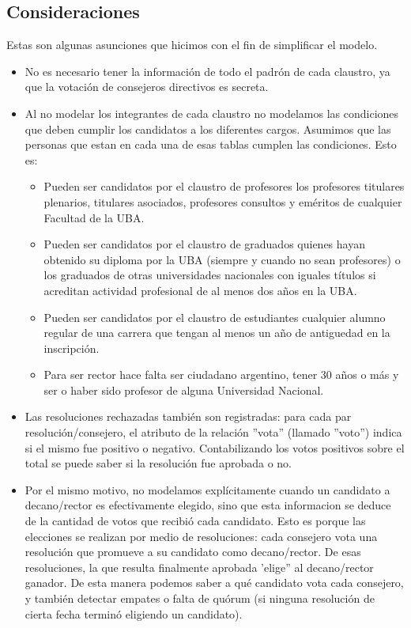 \subsection{Consideraciones}
Estas son algunas asunciones que hicimos con el fin de simplificar el modelo.

\begin{itemize}
\item  No es necesario tener la información de todo el padrón de cada claustro, ya que la votación de consejeros directivos es secreta.
\item Al no modelar los integrantes de cada claustro no modelamos las condiciones que deben cumplir los candidatos a los diferentes cargos. Asumimos que las personas que estan en cada una de esas tablas cumplen las condiciones. Esto es:
	\begin{itemize}
    \item Pueden ser candidatos por el claustro de profesores los profesores titulares plenarios, titulares asociados, profesores consultos y eméritos de cualquier Facultad de la UBA.
    \item Pueden ser candidatos por el claustro de graduados quienes hayan obtenido su diploma por la UBA (siempre y cuando no sean profesores) o los graduados de otras universidades nacionales con iguales títulos si acreditan actividad profesional de al menos dos años en la UBA.
    \item Pueden ser candidatos por el claustro de estudiantes cualquier alumno regular de una carrera que tengan al menos un año de antiguedad en la inscripción.
    \item Para ser rector hace falta ser ciudadano argentino, tener 30 años o más y ser o haber sido profesor de alguna Universidad Nacional.
    \end{itemize}
\item Las resoluciones rechazadas también son registradas: para cada par resolución/consejero, el atributo de la relación ''vota'' (llamado ''voto'') indica si el mismo fue positivo o negativo. Contabilizando los votos positivos sobre el total se puede saber si la resolución fue aprobada o no.
\item Por el mismo motivo, no modelamos explícitamente cuando un candidato a decano/rector es efectivamente elegido, sino que esta informacion se deduce de la cantidad de votos que recibió cada candidato. Esto es porque las elecciones se realizan por medio de resoluciones: cada consejero vota una resolución que promueve a su candidato como decano/rector. De esas resoluciones, la que resulta finalmente aprobada 'elige'' al decano/rector ganador. De esta manera podemos saber a qué candidato vota cada consejero, y también detectar empates o falta de quórum (si ninguna resolución de cierta fecha terminó eligiendo un candidato).
\end{itemize}

